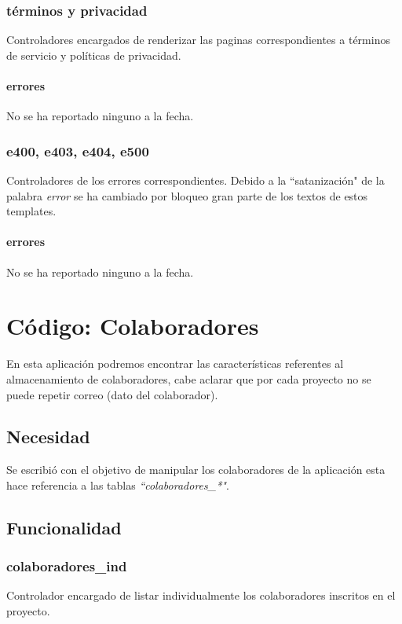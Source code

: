 \documentclass[10pt,a4paper]{book}
\begin{document}
	\subsection{términos y privacidad}
	Controladores encargados de renderizar las paginas correspondientes a términos de servicio y políticas de privacidad.
	\subsubsection{errores}
	No se ha reportado ninguno a la fecha.

	\subsection{e400, e403, e404, e500}
	Controladores de los errores correspondientes. Debido a la ``satanización" de la palabra \textit{error} se ha cambiado por bloqueo gran parte de los textos de estos templates.
	\subsubsection{errores}
	No se ha reportado ninguno a la fecha.
	

	\chapter{Código: Colaboradores}
	
	En esta aplicación podremos encontrar las características referentes al almacenamiento de colaboradores, cabe aclarar que por cada proyecto no se puede repetir correo (dato del colaborador).
	
	\section{Necesidad}
	
	Se escribió con el objetivo de manipular los colaboradores de la aplicación esta hace referencia a las tablas \textit{``colaboradores\_*"}. 
	
	\section{Funcionalidad}
	
	\subsection{colaboradores\_ind}
	Controlador encargado de listar individualmente los colaboradores inscritos en el proyecto.
\end{document}
